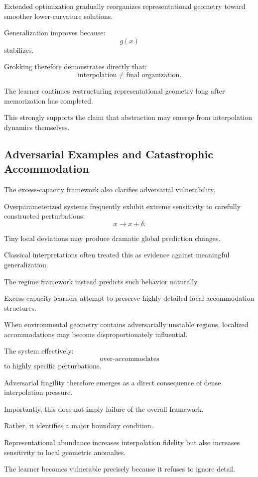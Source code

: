 \documentclass[12pt,a4paper]{article}
\begin{document}
Extended optimization gradually reorganizes representational geometry toward smoother lower-curvature solutions.

Generalization improves because:
\[
g(x)
\]
stabilizes.

Grokking therefore demonstrates directly that:
\[
\text{interpolation}
\neq
\text{final organization}.
\]

The learner continues restructuring representational geometry long after memorization has completed.

This strongly supports the claim that abstraction may emerge from interpolation dynamics themselves.

\subsection{Adversarial Examples and Catastrophic Accommodation}

The excess-capacity framework also clarifies adversarial vulnerability.

Overparameterized systems frequently exhibit extreme sensitivity to carefully constructed perturbations:
\[
x
\rightarrow
x+\delta.
\]

Tiny local deviations may produce dramatic global prediction changes.

Classical interpretations often treated this as evidence against meaningful generalization.

The regime framework instead predicts such behavior naturally.

Excess-capacity learners attempt to preserve highly detailed local accommodation structures.

When environmental geometry contains adversarially unstable regions, localized accommodations may become disproportionately influential.

The system effectively:
\[
\text{over-accommodates}
\]
to highly specific perturbations.

Adversarial fragility therefore emerges as a direct consequence of dense interpolation pressure.

Importantly, this does not imply failure of the overall framework.

Rather, it identifies a major boundary condition.

Representational abundance increases interpolation fidelity but also increases sensitivity to local geometric anomalies.

The learner becomes vulnerable precisely because it refuses to ignore detail.
\end{document}
